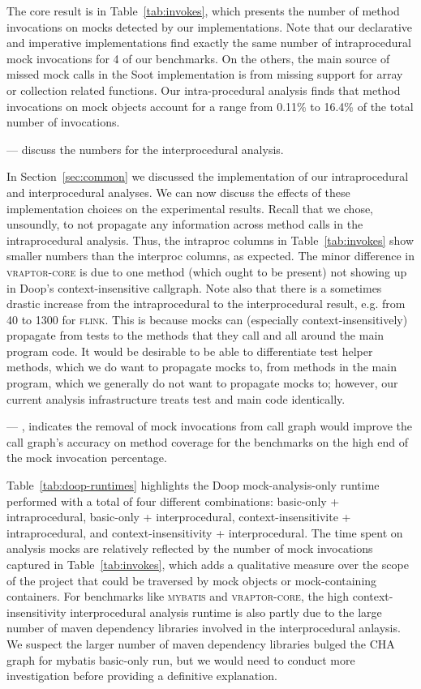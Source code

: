 The core result is in Table~\ref{tab:invokes}, which presents the number of method invocations on mocks detected by our implementations. Note that our declarative and imperative implementations find exactly the same number of intraprocedural mock invocations for 4 of our benchmarks. On the others, the main source of missed mock calls in the Soot implementation is from missing support for array or collection related functions. Our intra-procedural analysis finds that method invocations on mock objects account for a range from 0.11\% to 16.4\% of the total number of invocations. 

--- discuss the numbers for the interprocedural analysis.

In Section~\ref{sec:common} we discussed the implementation of our intraprocedural and interprocedural analyses. We can now discuss the effects of these implementation choices on the experimental results. Recall that we chose, unsoundly, to not propagate any information across method calls in the intraprocedural analysis. Thus, the intraproc columns in Table~\ref{tab:invokes} show smaller numbers than the interproc columns, as expected. The minor difference in \textsc{vraptor-core} is due to one method (which ought to be present) not showing up in Doop's context-insensitive callgraph. Note also that there is a sometimes drastic increase from the intraprocedural to the interprocedural result, e.g. from 40 to 1300 for \textsc{flink}. This is because mocks can (especially context-insensitively) propagate from tests to the methods that they call and all around the main program code. It would be desirable to be able to differentiate test helper methods, which we do want to propagate mocks to, from methods in the main program, which we generally do not want to propagate mocks to; however, our current analysis infrastructure treats test and main code identically.


--- , indicates the removal of mock invocations from call graph would improve the call graph's accuracy on method coverage for the benchmarks on the high end of the mock invocation percentage. 

Table~\ref{tab:doop-runtimes} highlights the Doop mock-analysis-only runtime performed with a total of four different combinations: basic-only + intraprocedural, basic-only + interprocedural, context-insensitivite + intraprocedural, and context-insensitivity + interprocedural. The time spent on analysis mocks are relatively reflected by the number of mock invocations captured in Table~\ref{tab:invokes}, which adds a qualitative measure over the scope of the project that could be traversed by mock objects or mock-containing containers. For benchmarks like \textsc{mybatis} and \textsc{vraptor-core}, the high context-insensitivity interprocedural analysis runtime is also partly due to the large number of maven dependency libraries involved in the interprocedural anlaysis. We suspect the larger number of maven dependency libraries bulged the CHA graph for mybatis basic-only run, but we would need to conduct more investigation before providing a definitive explanation.
 

